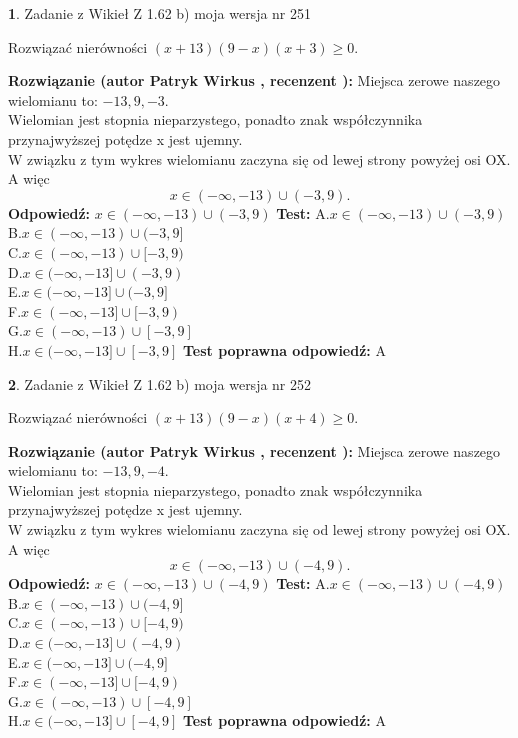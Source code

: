 \documentclass[12pt, a4paper]{article}
\theoremstyle{definition} %
\newtheorem{zad}{}
\newcommand{\zadStart}[1]{\begin{zad}#1\newline}
\newcommand{\zadStop}{\end{zad}}
\newcommand{\rozwStart}[2]{\noindent \textbf{Rozwiązanie (autor #1 , recenzent #2): }\newline}
\newcommand{\rozwStop}{\newline}
\newcommand{\odpStart}{\noindent \textbf{Odpowiedź:}\newline}
\newcommand{\odpStop}{\newline}
\newcommand{\testStart}{\noindent \textbf{Test:}\newline}
\newcommand{\testStop}{\newline}
\newcommand{\kluczStart}{\noindent \textbf{Test poprawna odpowiedź:}\newline}
\newcommand{\kluczStop}{\newline}
\begin{document}
\zadStart{Zadanie z Wikieł Z 1.62 b) moja wersja nr 251}

Rozwiązać nierówności $(x+13)(9-x)(x+3)\ge0$.
\zadStop
\rozwStart{Patryk Wirkus}{}
Miejsca zerowe naszego wielomianu to: $-13, 9, -3$.\\
Wielomian jest stopnia nieparzystego, ponadto znak współczynnika przy\linebreak najwyższej potędze x jest ujemny.\\ W związku z tym wykres wielomianu zaczyna się od lewej strony powyżej osi OX. A więc $$x \in (-\infty,-13) \cup (-3,9).$$
\rozwStop
\odpStart
$x \in (-\infty,-13) \cup (-3,9)$
\odpStop
\testStart
A.$x \in (-\infty,-13) \cup (-3,9)$\\
B.$x \in (-\infty,-13) \cup (-3,9]$\\
C.$x \in (-\infty,-13) \cup [-3,9)$\\
D.$x \in (-\infty,-13] \cup (-3,9)$\\
E.$x \in (-\infty,-13] \cup (-3,9]$\\
F.$x \in (-\infty,-13] \cup [-3,9)$\\
G.$x \in (-\infty,-13) \cup [-3,9]$\\
H.$x \in (-\infty,-13] \cup [-3,9]$
\testStop
\kluczStart
A
\kluczStop



\zadStart{Zadanie z Wikieł Z 1.62 b) moja wersja nr 252}

Rozwiązać nierówności $(x+13)(9-x)(x+4)\ge0$.
\zadStop
\rozwStart{Patryk Wirkus}{}
Miejsca zerowe naszego wielomianu to: $-13, 9, -4$.\\
Wielomian jest stopnia nieparzystego, ponadto znak współczynnika przy\linebreak najwyższej potędze x jest ujemny.\\ W związku z tym wykres wielomianu zaczyna się od lewej strony powyżej osi OX. A więc $$x \in (-\infty,-13) \cup (-4,9).$$
\rozwStop
\odpStart
$x \in (-\infty,-13) \cup (-4,9)$
\odpStop
\testStart
A.$x \in (-\infty,-13) \cup (-4,9)$\\
B.$x \in (-\infty,-13) \cup (-4,9]$\\
C.$x \in (-\infty,-13) \cup [-4,9)$\\
D.$x \in (-\infty,-13] \cup (-4,9)$\\
E.$x \in (-\infty,-13] \cup (-4,9]$\\
F.$x \in (-\infty,-13] \cup [-4,9)$\\
G.$x \in (-\infty,-13) \cup [-4,9]$\\
H.$x \in (-\infty,-13] \cup [-4,9]$
\testStop
\kluczStart
A
\kluczStop
\end{document}
